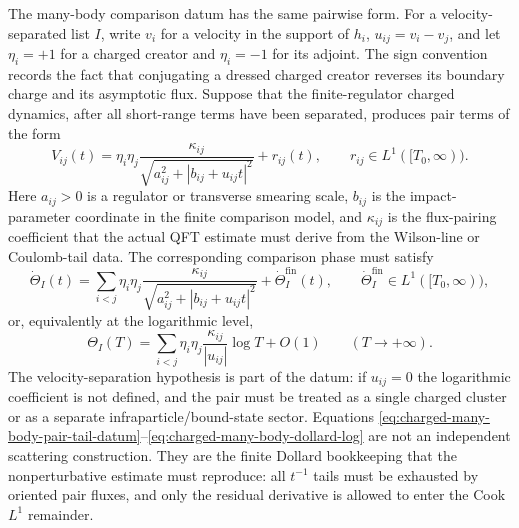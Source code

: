 The many-body comparison datum has the same pairwise form.  For a
velocity-separated list \(I\), write \(v_i\) for a velocity in the support of
\(h_i\), \(u_{ij}=v_i-v_j\), and let \(\eta_i=+1\) for a charged creator and
\(\eta_i=-1\) for its adjoint.  The sign convention records the fact that
conjugating a dressed charged creator reverses its boundary charge and its
asymptotic flux.  Suppose that the finite-regulator charged dynamics, after
all short-range terms have been separated, produces pair terms of the form
\begin{equation}
  V_{ij}(t)
  =
  \eta_i\eta_j
  \frac{\kappa_{ij}}
       {\sqrt{a_{ij}^2+|b_{ij}+u_{ij}t|^2}}
  +r_{ij}(t),
  \qquad
  r_{ij}\in L^1([T_0,\infty)).
  \label{eq:charged-many-body-pair-tail-datum}
\end{equation}
Here \(a_{ij}>0\) is a regulator or transverse smearing scale,
\(b_{ij}\) is the impact-parameter coordinate in the finite comparison
model, and \(\kappa_{ij}\) is the flux-pairing coefficient that the actual
QFT estimate must derive from the Wilson-line or Coulomb-tail data.  The
corresponding comparison phase must satisfy
\begin{equation}
  \dot\Theta_I(t)
  =
  \sum_{i<j}
  \eta_i\eta_j
  \frac{\kappa_{ij}}
       {\sqrt{a_{ij}^2+|b_{ij}+u_{ij}t|^2}}
  +\dot\Theta_I^{\mathrm{fin}}(t),
  \qquad
  \dot\Theta_I^{\mathrm{fin}}\in L^1([T_0,\infty)),
  \label{eq:charged-many-body-dollard-derivative}
\end{equation}
or, equivalently at the logarithmic level,
\begin{equation}
  \Theta_I(T)
  =
  \sum_{i<j}
  \eta_i\eta_j
  \frac{\kappa_{ij}}{|u_{ij}|}\log T
  +O(1)
  \qquad (T\to+\infty).
  \label{eq:charged-many-body-dollard-log}
\end{equation}
The velocity-separation hypothesis is part of the datum: if \(u_{ij}=0\) the
logarithmic coefficient is not defined, and the pair must be treated as a
single charged cluster or as a separate infraparticle/bound-state sector.
Equations
\eqref{eq:charged-many-body-pair-tail-datum}--\eqref{eq:charged-many-body-dollard-log}
are not an independent scattering construction.  They are the finite
Dollard bookkeeping that the nonperturbative estimate must reproduce:
all \(t^{-1}\) tails must be exhausted by oriented pair fluxes, and only the
residual derivative is allowed to enter the Cook \(L^1\) remainder.

